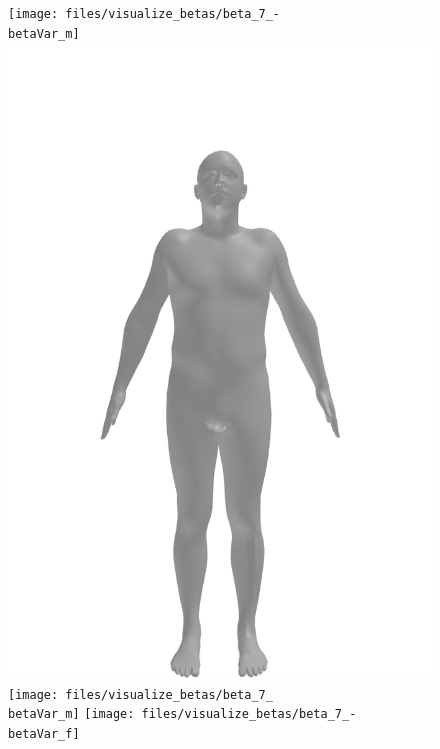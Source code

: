 \begin{figure}[ht!]
    \centering

    \begin{minipage}[b]{\textwidth}
        \centering
        \texttt{[image: files/visualize\_betas/beta\_7\_-\\betaVar\_m]}
        \includegraphics[width=\imgWidth]{files/visualize_betas/baseline_m}
        \texttt{[image: files/visualize\_betas/beta\_7\_\\betaVar\_m]}
        \linebreak
        \texttt{[image: files/visualize\_betas/beta\_7\_-\\betaVar\_f]}

\end{minipage}
\end{figure}
